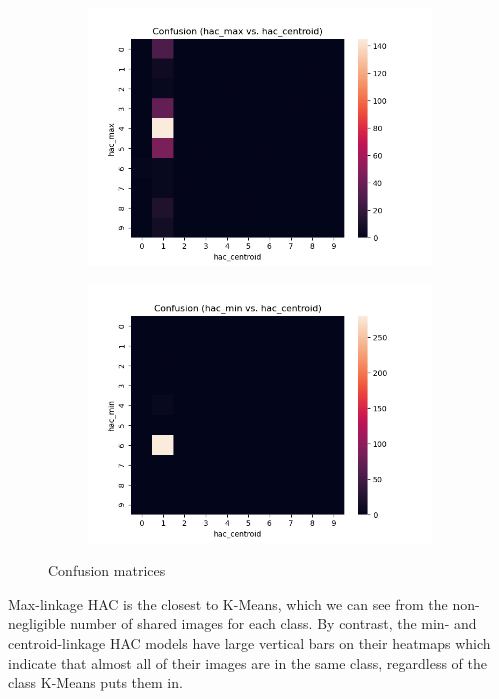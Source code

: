 \documentclass[submit]{harvardml}
\begin{document}
\begin{enumerate}
\begin{figure}[h]
\begin{subfigure}[b]{0.475\textwidth}
			\includegraphics[width=\textwidth]{hac_max_hac_centroid_confusion}
		\end{subfigure}
		\hfill
		\begin{subfigure}[b]{0.475\textwidth}
			\includegraphics[width=\textwidth]{hac_min_hac_centroid_confusion}
		\end{subfigure}
		\caption{Confusion matrices}
		\label{fig:2.6}
	\end{figure}

	Max-linkage HAC is the closest to K-Means, which we can see from the non-negligible number of shared images for each class. By contrast, the min- and centroid-linkage HAC models have large vertical bars on their heatmaps which indicate that almost all of their images are in the same class, regardless of the class K-Means puts them in.
	

\end{enumerate}
\end{document}
